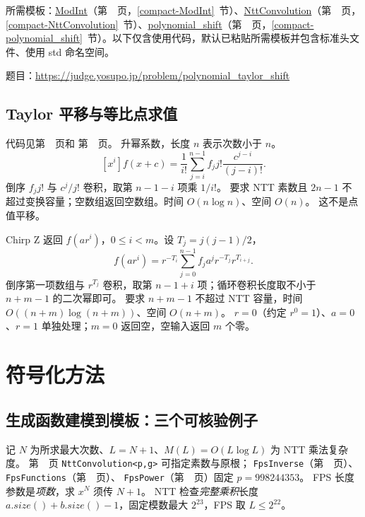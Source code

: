 所需模板：\hyperref[compact-ModInt]{ModInt}（第~\pageref{compact-ModInt}~页，\ref{compact-ModInt}~节）、\hyperref[compact-NttConvolution]{NttConvolution}（第~\pageref{compact-NttConvolution}~页，\ref{compact-NttConvolution}~节）、\hyperref[compact-polynomial_shift]{polynomial\_\allowbreak{}shift}（第~\pageref{compact-polynomial_shift}~页，\ref{compact-polynomial_shift}~节）。以下仅含使用代码，默认已粘贴所需模板并包含标准头文件、使用 std 命名空间。

题目：\url{https://judge.yosupo.jp/problem/polynomial_taylor_shift}



\subsection{Taylor 平移与等比点求值}\label{knowledge-poly-shift}
代码见第~\pageref{compact-polynomial_shift}~页和
第~\pageref{compact-chirp_z}~页。
升幂系数，长度 $n$ 表示次数小于 $n$。
\[
 [x^i]f(x+c)=\frac1{i!}\sum_{j=i}^{n-1} f_jj!\frac{c^{j-i}}{(j-i)!}.
\]
倒序 $f_jj!$ 与 $c^j/j!$ 卷积，取第 $n-1-i$ 项乘 $1/i!$。
要求 NTT 素数且 $2n-1$ 不超过变换容量；空数组返回空数组。时间 $O(n\log n)$、空间 $O(n)$。
这不是点值平移。

Chirp Z 返回 $f(ar^i)$，$0\le i<m$。设 $T_j=j(j-1)/2$，
\[
 f(ar^i)=r^{-T_i}\sum_{j=0}^{n-1}
        f_ja^jr^{-T_j}r^{T_{i+j}}.
\]
倒序第一项数组与 $r^{T_j}$ 卷积，取第 $n-1+i$ 项；循环卷积长度取不小于 $n+m-1$ 的二次幂即可。
要求 $n+m-1$ 不超过 NTT 容量，时间 $O((n+m)\log(n+m))$、空间 $O(n+m)$。
$r=0$（约定 $r^0=1$）、$a=0$、$r=1$ 单独处理；$m=0$ 返回空，空输入返回 $m$ 个零。

\clearpage


\Needspace{180pt}

\section{符号化方法}

\subsection{生成函数建模到模板：三个可核验例子}\label{knowledge-generating-examples}
记 $N$ 为所求最大次数、$L=N+1$、$M(L)=O(L\log L)$ 为 NTT 乘法复杂度。
第~\pageref{compact-NttConvolution}~页 \texttt{NttConvolution<p,g>} 可指定素数与原根；
\texttt{FpsInverse}（第~\pageref{compact-FpsInverse}~页）、\texttt{FpsFunctions}（第~\pageref{compact-FpsFunctions}~页）、
\texttt{FpsPower}（第~\pageref{compact-FpsPower}~页）固定 $p=998244353$。
FPS 长度参数是\emph{项数}，求 $x^N$ 须传 $N+1$。
NTT 检查\emph{完整乘积}长度 $a.size()+b.size()-1$，固定模数最大 $2^{23}$，FPS 取 $L\le2^{22}$。

